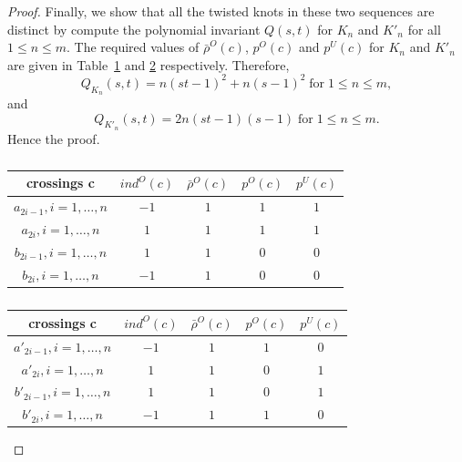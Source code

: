 \documentclass[10pt,a4paper,reqno]{amsart}
\theoremstyle{definition}
\theoremstyle{remark}
\begin{document}
\begin{proof}
			 
		Finally, we show that all the twisted knots in these two sequences are distinct by compute the polynomial invariant $ Q(s,t)$ for $K_{n}$ and  $K'_{n}$ for all $1 \leq n \leq m$. The required values of  $\bar{\rho}^{O}(c)$, $p^{O}(c)$ and $p^{U}(c)$ for $K_{n}$ and  $K'_{n}$ are given in Table~\ref{tab:Kn} and \ref{tab:Kbarn} respectively. Therefore,  
		\[ Q_{K_n}(s,t) = n(st-1)^2+n(s-1)^2 \; \text{for}\;1 \leq n \leq m,\]
		and
		\[ Q_{K'_n}(s,t) = 2n(st-1)(s-1) \; \text{for}\; 1 \leq n \leq m.\]
		Hence the proof.
	\begin{table}[h!]
		\centering
		\begin{tabular}{ |c|c|c|c|c|}
			\hline
			crossings c & $ind^O(c)$ & $\bar{\rho}^{O}(c)$ & $p^{O}(c)$ & $p^{U}(c)$ \\ 
			\hline 
			$a_{2i-1}, i=1,\dots,n$ & $-1$ & $1$ & $1$ & $1$ \\ 
			\hline
			$a_{2i}, i=1,\dots,n$ & $1$ & $1$ & $1$ & $1$ \\
			\hline
			$b_{2i-1}, i=1,\dots,n$ & $1$ & $1$ & $0$ & $0$ \\
			\hline
			$b_{2i}, i=1,\dots,n$ & $-1$ & $1$ & $0$ & $0$  \\
			\hline
			\end{tabular}
		\caption{}
		\label{tab:Kn}
	\end{table}
	\begin{table}[h!]
		\centering
		\begin{tabular}{ |c|c|c|c|c|}
			\hline
			crossings c & $ind^O(c)$ & $\bar{\rho}^{O}(c)$ & $p^{O}(c)$ & $p^{U}(c)$ \\ 
			\hline 
			$a'_{2i-1}, i=1,\dots,n$ & $-1$ & $1$ & $1$ & $0$ \\ 
			\hline
			$a'_{2i}, i=1,\dots,n$ & $1$ & $1$ & $0$ & $1$ \\
			\hline
			$b'_{2i-1}, i=1,\dots,n$ & $1$ & $1$ & $0$ & $1$ \\
			\hline
			$b'_{2i}, i=1,\dots,n$ & $-1$ & $1$ & $1$ & $0$  \\
			\hline
			
		\end{tabular}
		\caption{}
		\label{tab:Kbarn}
	\end{table}
		\end{proof}
\end{document}
